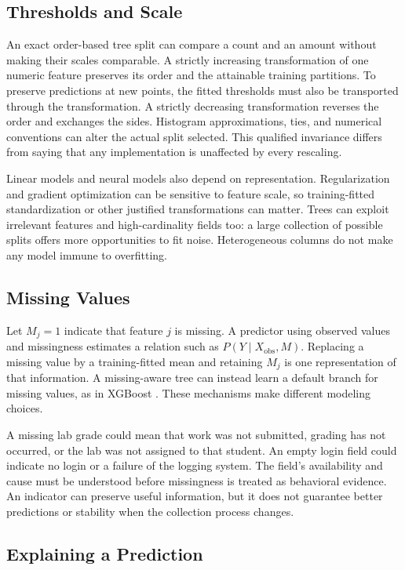 \subsection{Thresholds and Scale}

An exact order-based tree split can compare a count and an amount without making their scales comparable. A strictly increasing transformation of one numeric feature preserves its order and the attainable training partitions. To preserve predictions at new points, the fitted thresholds must also be transported through the transformation. A strictly decreasing transformation reverses the order and exchanges the sides. Histogram approximations, ties, and numerical conventions can alter the actual split selected. This qualified invariance differs from saying that any implementation is unaffected by every rescaling.

Linear models and neural models also depend on representation. Regularization and gradient optimization can be sensitive to feature scale, so training-fitted standardization or other justified transformations can matter. Trees can exploit irrelevant features and high-cardinality fields too: a large collection of possible splits offers more opportunities to fit noise. Heterogeneous columns do not make any model immune to overfitting.

\subsection{Missing Values}

Let $M_j=1$ indicate that feature $j$ is missing. A predictor using observed values and missingness estimates a relation such as $P(Y\mid X_{\mathrm{obs}},M)$. Replacing a missing value by a training-fitted mean and retaining $M_j$ is one representation of that information. A missing-aware tree can instead learn a default branch for missing values, as in XGBoost \citep{chen2016xgboost}. These mechanisms make different modeling choices.

A missing lab grade could mean that work was not submitted, grading has not occurred, or the lab was not assigned to that student. An empty login field could indicate no login or a failure of the logging system. The field's availability and cause must be understood before missingness is treated as behavioral evidence. An indicator can preserve useful information, but it does not guarantee better predictions or stability when the collection process changes.

\subsection{Explaining a Prediction}

